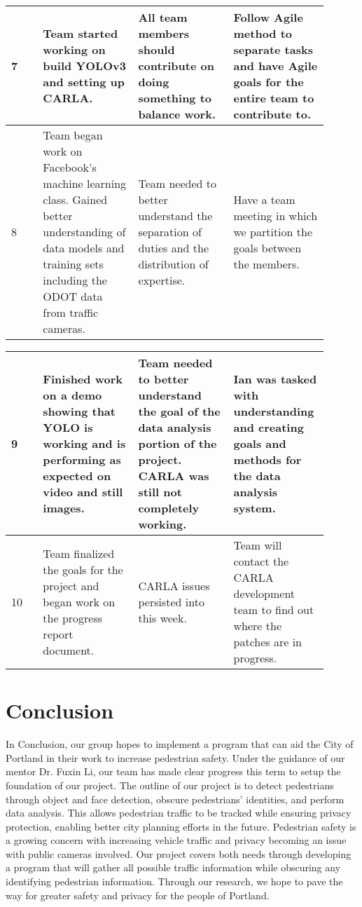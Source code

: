 \begin{center}
{\begin{tabular}{|l|p{0.3\linewidth}|p{0.3\linewidth}|p{0.3\linewidth}|}
 \hline
 7 & Team started working on build YOLOv3 and setting up CARLA.& All team members should contribute on doing something to balance work.& Follow Agile method to separate tasks and have Agile goals for the entire team to contribute to.\\
 \hline
 8 & Team began work on Facebook's machine learning class. Gained better understanding of data models and training sets including the ODOT data from traffic cameras.& Team needed to better understand the separation of duties and the distribution of expertise. & Have a team meeting in which we partition the goals between the members. \\
 \hline
 \end{tabular}
}
\end{center}
\begin{center}
{
 \begin{tabular}{|l|p{0.3\linewidth}|p{0.3\linewidth}|p{0.3\linewidth}|}
 \hline
 9 & Finished work on a demo showing that YOLO is working and is performing as expected on video and still images. & Team needed to better understand the goal of the data analysis portion of the project. CARLA was still not completely working. & Ian was tasked with understanding and creating goals and methods for the data analysis system. \\
 \hline
 10 & Team finalized the goals for the project and began work on the progress report document. & CARLA issues persisted into this week. & Team will contact the CARLA development team to find out where the patches are in progress. \\
 \hline
 \end{tabular}
}
\end{center}
\section{Conclusion}
In Conclusion, our group hopes to implement a program that can aid the City of Portland in their work to increase pedestrian safety. Under the guidance of our mentor Dr. Fuxin Li, our team has made clear progress this term to setup the foundation of our project. The outline of our project is to detect pedestrians through object and face detection, obscure pedestrians’ identities, and perform data analysis. This allows pedestrian traffic to be tracked while ensuring privacy protection, enabling better city planning efforts in the future. Pedestrian safety is a growing concern with increasing vehicle traffic and privacy becoming an issue with public cameras involved. Our project covers both needs through developing a program that will gather all possible traffic information while obscuring any identifying pedestrian information. Through our research, we hope to pave the way for greater safety and privacy for the people of Portland. 